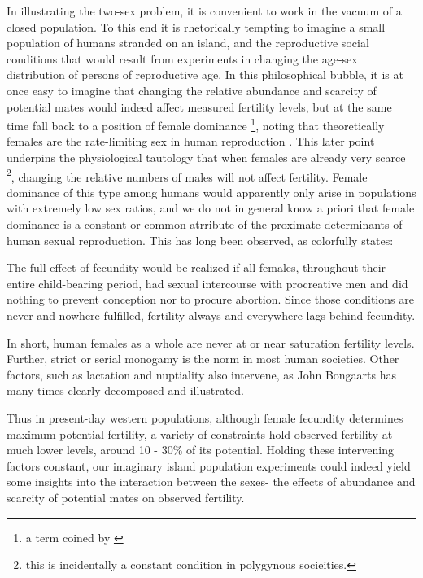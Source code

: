 
In illustrating the two-sex problem, it is convenient to work in the vacuum of a 
closed population. To this end it is rhetorically tempting to imagine a small
population of humans stranded on an island, and the reproductive social
conditions that would result from experiments in changing the age-sex
distribution of persons of reproductive age. In this philosophical bubble, it is
at once easy to imagine that changing the relative abundance and scarcity of
potential mates would indeed affect measured fertility levels, but at the same
time fall back to a position of female dominance \footnote{a term coined by
\citet{goodman1953population}}, noting that theoretically females are the
rate-limiting sex in human reproduction \citep{wood1994dynamics}. This later
point underpins the physiological tautology that when females are already very scarce
\footnote{this is incidentally a constant condition in polygynous socieities.}, changing the
relative numbers of males will not affect fertility. Female dominance of this
type among humans would apparently only arise in populations with extremely low
sex ratios, and we do not in general know a priori that female dominance is a 
constant or common atrribute of the proximate determinants of human sexual
reproduction. This has long been observed, as
\citet[p. 1]{kuczynski1935measurement} colorfully states:
\begin{citation}
The full effect of fecundity would be realized if all females, throughout their
entire child-bearing period, had sexual intercourse with procreative men and did
nothing to prevent conception nor to procure abortion. Since those conditions
are never and nowhere fulfilled, fertility always and everywhere lags behind
fecundity.
\end{citation}

In short, human females as a whole are never at or near saturation fertility
levels. Further, strict or serial monogamy is the norm in most human societies.
Other factors, such as lactation and nuptiality also intervene, as John
Bongaarts \citep{bongaarts1978framework, bongaarts1982fertility, bongaarts1983fertility} 
has many times clearly decomposed and illustrated. 

Thus in present-day western populations, although female fecundity determines
maximum potential fertility, a variety of constraints hold observed fertility at
much lower levels, around 10 - 30\% of its potential. Holding these intervening
factors constant, our imaginary island population experiments could indeed yield
some insights into the interaction between the sexes- the effects of abundance and scarcity of
potential mates on observed fertility. 

